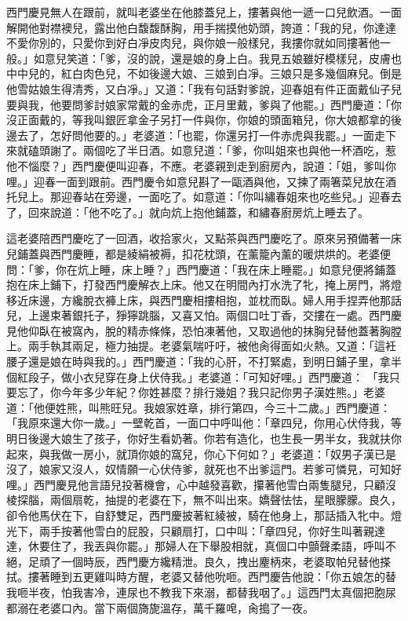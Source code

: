 西門慶見無人在跟前，就叫老婆坐在他膝蓋兒上，摟著與他一遞一口兒飲酒。一面解開他對襟襖兒，露出他白馥馥酥胸，用手揣摸他奶頭，誇道：「我的兒，你達達不愛你別的，只愛你到好白凈皮肉兒，與你娘一般樣兒，我摟你就如同摟著他一般。」如意兒笑道：「爹，沒的說，還是娘的身上白。我見五娘雖好模樣兒，皮膚也中中兒的，紅白肉色兒，不如後邊大娘、三娘到白凈。三娘只是多幾個麻兒。倒是他雪姑娘生得清秀，又白凈。」又道：「我有句話對爹說，迎春姐有件正面戴仙子兒要與我，他要問爹討娘家常戴的金赤虎，正月里戴，爹與了他罷。」西門慶道：「你沒正面戴的，等我叫銀匠拿金子另打一件與你，你娘的頭面箱兒，你大娘都拿的後邊去了，怎好問他要的。」老婆道：「也罷，你還另打一件赤虎與我罷。」一面走下來就磕頭謝了。兩個吃了半日酒。如意兒道：「爹，你叫姐來也與他一杯酒吃，惹他不惱麼？」西門慶便叫迎春，不應。老婆親到走到廚房內，說道：「姐，爹叫你哩。」迎春一面到跟前。西門慶令如意兒斟了一甌酒與他，又揀了兩箸菜兒放在酒托兒上。那迎春站在旁邊，一面吃了。如意道：「你叫繡春姐來也吃些兒。」迎春去了，回來說道：「他不吃了。」就向炕上抱他鋪蓋，和繡春廚房炕上睡去了。

這老婆陪西門慶吃了一回酒，收拾家火，又點茶與西門慶吃了。原來另預備著一床兒鋪蓋與西門慶睡，都是綾絹被褥，扣花枕頭，在薰籠內薰的暖烘烘的。老婆便問：「爹，你在炕上睡，床上睡？」西門慶道：「我在床上睡罷。」如意兒便將鋪蓋抱在床上鋪下，打發西門慶解衣上床。他又在明間內打水洗了牝，掩上房門，將燈移近床邊，方纔脫衣褲上床，與西門慶相摟相抱，並枕而臥。婦人用手捏弄他那話兒，上邊束著銀托子，猙獰跳腦，又喜又怕。兩個口吐丁香，交摟在一處。西門慶見他仰臥在被窩內，脫的精赤條條，恐怕凍著他，又取過他的抹胸兒替他蓋著胸膛上。兩手執其兩足，極力抽提。老婆氣喘吁吁，被他肏得面如火熱。又道：「這衽腰子還是娘在時與我的。」西門慶道：「我的心肝，不打緊處，到明日鋪子里，拿半個紅段子，做小衣兒穿在身上伏侍我。」老婆道：「可知好哩。」西門慶道： 「我只要忘了，你今年多少年紀？你姓甚麼？排行幾姐？我只記你男子漢姓熊。」老婆道：「他便姓熊，叫熊旺兒。我娘家姓章，排行第四，今三十二歲。」西門慶道：「我原來還大你一歲。」一壁乾首，一面口中呼叫他：「章四兒，你用心伏侍我，等明日後邊大娘生了孩子，你好生看奶著。你若有造化，也生長一男半女，我就扶你起來，與我做一房小，就頂你娘的窩兒，你心下何如？」老婆道：「奴男子漢已是沒了，娘家又沒人，奴情願一心伏侍爹，就死也不出爹這門。若爹可憐見，可知好哩。」西門慶見他言語兒投著機會，心中越發喜歡，攥著他雪白兩隻腿兒，只顧沒棱探腦，兩個扇乾，抽提的老婆在下，無不叫出來。嬌聲怯怯，星眼朦朦。良久，卻令他馬伏在下，自舒雙足，西門慶披著紅綾被，騎在他身上，那話插入牝中。燈光下，兩手按著他雪白的屁股，只顧扇打，口中叫：「章四兒，你好生叫著親達達，休要住了，我丟與你罷。」那婦人在下舉股相就，真個口中顫聲柔語，呼叫不絕，足頑了一個時辰，西門慶方纔精泄。良久，拽出麈柄來，老婆取帕兒替他搽拭。摟著睡到五更雞叫時方醒，老婆又替他吮咂。西門慶告他說：「你五娘怎的替我咂半夜，怕我害冷，連尿也不教我下來溺，都替我咽了。」這西門太真個把胞尿都溺在老婆口內。當下兩個旖旎溫存，萬千羅唣，肏搗了一夜。

